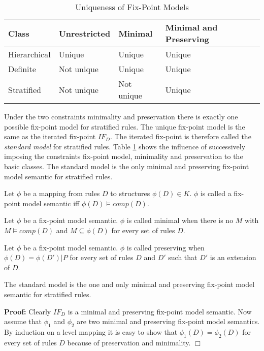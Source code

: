 \begin{table}
\begin{center}
\begin{tabular}{l|lll}
Class & Unrestricted & Minimal & Minimal and Preserving \\
\hline
Hierarchical & Unique & Unique & Unique \\
Definite & Not unique & Unique & Unique \\
Stratified & Not unique & Not unique & Unique
\end{tabular}
\end{center}
\caption{Uniqueness of Fix-Point Models}
\label{tabsem}
\end{table}

Under the two constraints minimality and preservation there is exactly one possible fix-point
model for stratified rules. The unique fix-point model is the same as the iterated fix-point 
$IF_D$. The iterated fix-point is therefore called the {\em standard model} for stratified rules. 
Table \ref{tabsem} shows the influence of successively imposing the constraints fix-point
model, minimality and preservation to the basic classes. The standard model is the only
minimal and preserving fix-point model semantic for stratified rules.

\begin{Def} Let $\phi$ be a mapping from rules $D$ to structures $\phi(D) \in K$. 
$\phi$ is called a fix-point model semantic iff $\phi(D) \models comp(D)$.
\end{Def}

\begin{Def} Let $\phi$ be a fix-point model semantic. $\phi$ is called minimal
when there is no $M$ with $M \models comp(D)$ and $M\subseteq \phi(D)$ for every
set of rules $D$.
\end{Def}

\begin{Def} Let $\phi$ be a fix-point model semantic. $\phi$ is called preserving
when $\phi(D) = \phi(D')|P$ for every set of rules $D$ and $D'$ such that $D'$ is
an extension of $D$.
\end{Def}

\begin{Pro} The standard model is the one and only minimal and preserving fix-point 
model semantic for stratified rules.
\end{Pro}

{\bf Proof:} Clearly $IF_D$ is a minimal and preserving fix-point model semantic. Now assume 
that $\phi_1$ and $\phi_2$ are two minimal and preserving fix-point model semantics. 
By induction on a level mapping it is easy to show that $\phi_1(D) = \phi_2(D)$ for every
set of rules $D$ because of preservation and minimality. \hfill $\Box$

